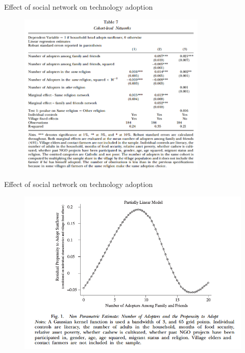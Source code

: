 \documentclass{beamer}
\begin{document}
\begin{frame}{Effect of social network on technology adoption}{}
\begin{figure}[h]
\begin{centering}
  \includegraphics[width=0.8\textwidth]{01table7}
   \label{fig:01table7}
\end{centering}
\end{figure}
\end{frame}

\begin{frame}{Effect of social network on technology adoption}{}
\begin{figure}[h]
\begin{centering}
  \includegraphics[width=\textwidth]{01fig1}
   \label{fig:01fig1}
\end{centering}
\end{figure}
\end{frame}
\end{document}
